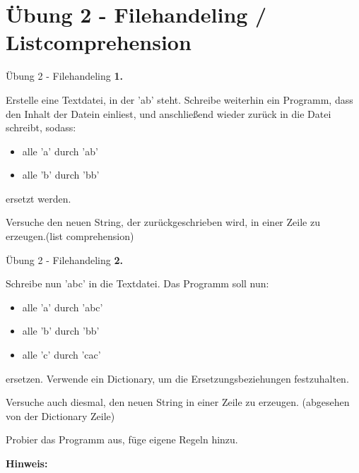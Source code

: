 \section{Übung 2 - Filehandeling / Listcomprehension}
\begin{frame}{Übung 2 - Filehandeling}
	\textbf{1.}
	
	Erstelle eine Textdatei, in der 'ab' steht. Schreibe weiterhin ein Programm, dass den Inhalt der Datein einliest, und anschließend wieder zurück in die Datei schreibt, sodass:
	\begin{itemize}
		\item alle \alert{'a'} durch \alert{'ab'}
		\item alle \alert{'b'} durch \alert{'bb'}
	\end{itemize}
	ersetzt werden.
	
	Versuche den neuen String, der zurückgeschrieben wird, in einer Zeile zu erzeugen.(list comprehension)
\end{frame}
\begin{frame}{Übung 2 - Filehandeling}
	\textbf{2.}
	
	Schreibe nun 'abc' in die Textdatei. Das Programm soll nun:
	\begin{itemize}
		\item alle \alert{'a'} durch \alert{'abc'}
		\item alle \alert{'b'} durch \alert{'bb'}
		\item alle \alert{'c'} durch \alert{'cac'}
	\end{itemize}
	ersetzen.
	Verwende ein Dictionary, um die Ersetzungsbeziehungen festzuhalten.
	
	Versuche auch diesmal, den neuen String in einer Zeile zu erzeugen. (abgesehen von der Dictionary Zeile)
	
	Probier das Programm aus, füge eigene Regeln hinzu.
	
	\textbf{Hinweis: }
\end{frame}


